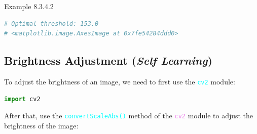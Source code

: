 \documentclass{book}
\begin{document}
\begin{egBox}{Example 8.3.4.2}{}
\begin{lstlisting}[language=Python, basicstyle=\ttfamily\small, keywordstyle=\color{blue}, commentstyle=\color{forestgreen}, stringstyle=\color{red}, showstringspaces=false]
# Optimal threshold: 153.0
# <matplotlib.image.AxesImage at 0x7fe54284ddd0>
    \end{lstlisting}
    \begin{center}
    \end{center}
\end{egBox}
\newpage
\subsection{Brightness Adjustment (\textit{Self Learning})}
To adjust the brightness of an image, we need to first use the \textcolor{cyan}{\texttt{cv2}} module:
\begin{lstlisting}[language=Python, basicstyle=\ttfamily\small, keywordstyle=\color{blue}, commentstyle=\color{forestgreen}, stringstyle=\color{red}, showstringspaces=false]
                                            import cv2
\end{lstlisting}
After that, use the \textcolor{cyan}{\texttt{convertScaleAbs()}} method of the \textcolor{violet}{\texttt{cv2}} module to adjust the brightness of the image:
\end{document}
